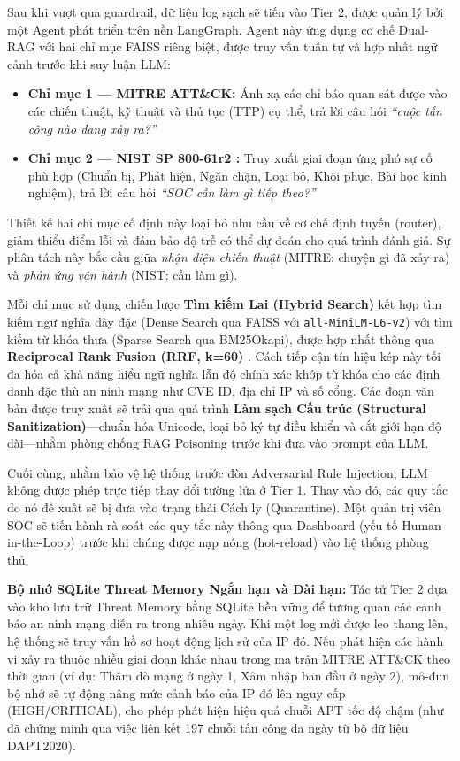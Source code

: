 \documentclass[12pt,a4paper]{article}
\begin{document}
Sau khi vượt qua guardrail, dữ liệu log sạch sẽ tiến vào Tier 2, được quản lý bởi một Agent phát triển trên nền LangGraph. Agent này ứng dụng cơ chế Dual-RAG với hai chỉ mục FAISS riêng biệt, được truy vấn tuần tự và hợp nhất ngữ cảnh trước khi suy luận LLM:
\begin{itemize}
    \item \textbf{Chỉ mục 1 --- MITRE ATT\&CK:} Ánh xạ các chỉ báo quan sát được vào các chiến thuật, kỹ thuật và thủ tục (TTP) cụ thể, trả lời câu hỏi \textit{``cuộc tấn công nào đang xảy ra?''}
    \item \textbf{Chỉ mục 2 --- NIST SP 800-61r2 \cite{nist80061}:} Truy xuất giai đoạn ứng phó sự cố phù hợp (Chuẩn bị, Phát hiện, Ngăn chặn, Loại bỏ, Khôi phục, Bài học kinh nghiệm), trả lời câu hỏi \textit{``SOC cần làm gì tiếp theo?''}
\end{itemize}
Thiết kế hai chỉ mục cố định này loại bỏ nhu cầu về cơ chế định tuyến (router), giảm thiểu điểm lỗi và đảm bảo độ trễ có thể dự đoán cho quá trình đánh giá. Sự phân tách này bắc cầu giữa \textit{nhận diện chiến thuật} (MITRE: chuyện gì đã xảy ra) và \textit{phản ứng vận hành} (NIST: cần làm gì).

Mỗi chỉ mục sử dụng chiến lược \textbf{Tìm kiếm Lai (Hybrid Search)} kết hợp tìm kiếm ngữ nghĩa dày đặc (Dense Search qua FAISS với \verb|all-MiniLM-L6-v2|) với tìm kiếm từ khóa thưa (Sparse Search qua BM25Okapi), được hợp nhất thông qua \textbf{Reciprocal Rank Fusion (RRF, k=60)} \cite{rrf2009}. Cách tiếp cận tín hiệu kép này tối đa hóa cả khả năng hiểu ngữ nghĩa lẫn độ chính xác khớp từ khóa cho các định danh đặc thù an ninh mạng như CVE ID, địa chỉ IP và số cổng. Các đoạn văn bản được truy xuất sẽ trải qua quá trình \textbf{Làm sạch Cấu trúc (Structural Sanitization)}---chuẩn hóa Unicode, loại bỏ ký tự điều khiển và cắt giới hạn độ dài---nhằm phòng chống RAG Poisoning trước khi đưa vào prompt của LLM.

Cuối cùng, nhằm bảo vệ hệ thống trước đòn Adversarial Rule Injection, LLM không được phép trực tiếp thay đổi tường lửa ở Tier 1. Thay vào đó, các quy tắc do nó đề xuất sẽ bị đưa vào trạng thái Cách ly (Quarantine). Một quản trị viên SOC sẽ tiến hành rà soát các quy tắc này thông qua Dashboard (yếu tố Human-in-the-Loop) trước khi chúng được nạp nóng (hot-reload) vào hệ thống phòng thủ.

\textbf{Bộ nhớ SQLite Threat Memory Ngắn hạn và Dài hạn:} Tác tử Tier 2 dựa vào kho lưu trữ Threat Memory bằng SQLite bền vững để tương quan các cảnh báo an ninh mạng diễn ra trong nhiều ngày. Khi một log mới được leo thang lên, hệ thống sẽ truy vấn hồ sơ hoạt động lịch sử của IP đó. Nếu phát hiện các hành vi xảy ra thuộc nhiều giai đoạn khác nhau trong ma trận MITRE ATT\&CK theo thời gian (ví dụ: Thăm dò mạng ở ngày 1, Xâm nhập ban đầu ở ngày 2), mô-đun bộ nhớ sẽ tự động nâng mức cảnh báo của IP đó lên nguy cấp (HIGH/CRITICAL), cho phép phát hiện hiệu quả chuỗi APT tốc độ chậm (như đã chứng minh qua việc liên kết 197 chuỗi tấn công đa ngày từ bộ dữ liệu DAPT2020).
\end{document}
